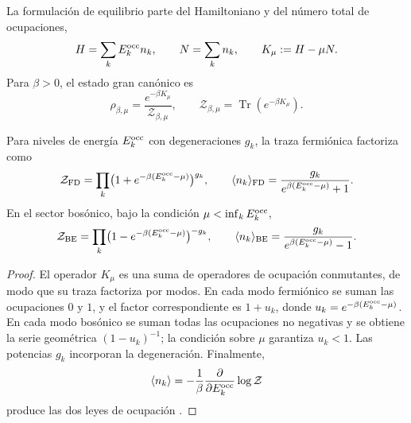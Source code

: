 La formulación de equilibrio parte del Hamiltoniano y del número total de
ocupaciones,
\begin{equation}
 H=\sum_kE_k^{\rm occ} n_k,
 \qquad
 N=\sum_k n_k,
 \qquad
 K_\mu:=H-\mu N.
 \label{v:rec:eq:hamiltoniano-gran-canonico-rev3}
\end{equation}
Para \(\beta>0\), el estado gran canónico es
\begin{equation}
 \rho_{\beta,\mu}
 =\frac{e^{-\beta K_\mu}}{\mathcal Z_{\beta,\mu}},
 \qquad
 \mathcal Z_{\beta,\mu}
 =\operatorname{Tr}(e^{-\beta K_\mu}).
 \label{v:rec:eq:estado-gran-canonico-rev3}
\end{equation}

\begin{theorem}
\label{v:rec:thm:factorizacion-gran-canonica-rev3}
Para niveles de energía \(E_k^{\rm occ}\) con degeneraciones \(g_k\), la
traza fermiónica factoriza como
\begin{equation}
 \mathcal Z_{\rm FD}
 =\prod_k\bigl(1+e^{-\beta(E_k^{\rm occ}-\mu)}\bigr)^{g_k},
 \qquad
 \langle n_k\rangle_{\rm FD}
 =\frac{g_k}{e^{\beta(E_k^{\rm occ}-\mu)}+1}.
 \label{v:rec:eq:factorizacion-fd-rev3}
\end{equation}
En el sector bosónico, bajo la condición
\(\mu<\inf_kE_k^{\rm occ}\),
\begin{equation}
 \mathcal Z_{\rm BE}
 =\prod_k\bigl(1-e^{-\beta(E_k^{\rm occ}-\mu)}\bigr)^{-g_k},
 \qquad
 \langle n_k\rangle_{\rm BE}
 =\frac{g_k}{e^{\beta(E_k^{\rm occ}-\mu)}-1}.
 \label{v:rec:eq:factorizacion-be-rev3}
\end{equation}
\end{theorem}

\begin{proof}
El operador \(K_\mu\) es una suma de operadores de ocupación conmutantes, de
modo que su traza factoriza por modos. En cada modo fermiónico se suman las
ocupaciones \(0\) y \(1\), y el factor correspondiente es
\(1+u_k\), donde
\(u_k=e^{-\beta(E_k^{\rm occ}-\mu)}\). En cada modo bosónico se suman todas
las ocupaciones no negativas y se obtiene la serie geométrica
\((1-u_k)^{-1}\); la condición sobre \(\mu\) garantiza \(u_k<1\). Las
potencias \(g_k\) incorporan la degeneración. Finalmente,
\[
 \langle n_k\rangle
 =-\frac1\beta\frac{\partial}{\partial E_k^{\rm occ}}
   \log\mathcal Z
\]
produce las dos leyes de ocupación
\cite{Bose1924,Einstein1924,Fermi1926,Dirac1926,Pathria2011}.
\end{proof}

